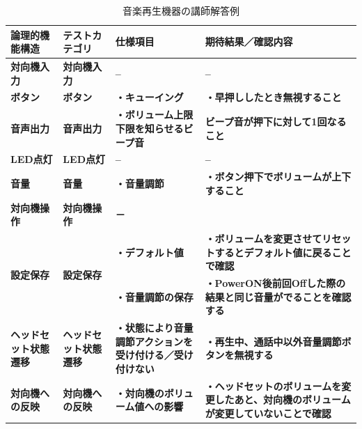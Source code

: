 \begin{table}[htbp]
  \scriptsize
  \centering
  \caption{音楽再生機器の講師解答例}
    \begin{tabular}{|l|l|p{13em}|p{18em}|}
    \hline
    \multicolumn{1}{|p{8em}|}{\textbf{論理的機能構造}} & \multicolumn{1}{p{14em}|}{\textbf{テストカテゴリ}} & \textbf{仕様項目} & \textbf{期待結果／確認内容} \bigstrut\\
    \hline
    \multicolumn{1}{|p{8.665em}|}{\textbf{対向機入力}} & \multicolumn{1}{p{14.085em}|}{\textbf{対向機入力}} & \textbf{--} & \textbf{--} \bigstrut\\
    \hline
    \multicolumn{1}{|p{8.665em}|}{\textbf{ボタン}} & \multicolumn{1}{p{14.085em}|}{\textbf{ボタン}} & \textbf{・キューイング} & \textbf{・早押ししたとき無視すること} \bigstrut\\
    \hline
    \multicolumn{1}{|p{8.665em}|}{\textbf{音声出力}} & \multicolumn{1}{p{14.085em}|}{\textbf{音声出力}} & \textbf{・ボリューム上限下限を知らせるビープ音} & \textbf{ビープ音が押下に対して1回なること} \bigstrut\\
    \hline
    \multicolumn{1}{|p{8.665em}|}{\textbf{LED点灯}} & \multicolumn{1}{p{14.085em}|}{\textbf{LED点灯}} & \textbf{--} & \textbf{--} \bigstrut\\
    \hline
    \multicolumn{1}{|p{8.665em}|}{\textbf{音量}} & \multicolumn{1}{p{14.085em}|}{\textbf{音量}} & \textbf{・音量調節} & \textbf{・ボタン押下でボリュームが上下すること} \bigstrut\\
    \hline
    \multicolumn{1}{|p{8.665em}|}{\textbf{対向機操作}} & \multicolumn{1}{p{14.085em}|}{\textbf{対向機操作}} & \textbf{－} & \multicolumn{1}{r|}{} \bigstrut\\
    \hline
    \multicolumn{1}{|l|}{\multirow{2}[2]{*}{\textbf{設定保存}}} & \multicolumn{1}{l|}{\multirow{2}[2]{*}{\textbf{設定保存}}} & \textbf{・デフォルト値} & \textbf{・ボリュームを変更させてリセットするとデフォルト値に戻ることで確認} \bigstrut[t]\\
          &       & \textbf{・音量調節の保存} & \textbf{・PowerON後前回Offした際の結果と同じ音量がでることを確認する} \bigstrut[b]\\
    \hline
    \multicolumn{1}{|p{8.665em}|}{\textbf{ヘッドセット状態遷移}} & \multicolumn{1}{p{14.085em}|}{\textbf{ヘッドセット状態遷移}} & \textbf{・状態により音量調節アクションを受け付ける／受け付けない} & \textbf{・再生中、通話中以外音量調節ボタンを無視する} \bigstrut\\
    \hline
    \multicolumn{1}{|p{8.665em}|}{\textbf{対向機への反映}} & \multicolumn{1}{p{14.085em}|}{\textbf{対向機への反映}} & \textbf{・対向機のボリューム値への影響} & \textbf{・ヘッドセットのボリュームを変更したあと、対向機のボリュームが変更していないことで確認} \bigstrut\\

\end{tabular}
\end{table}
